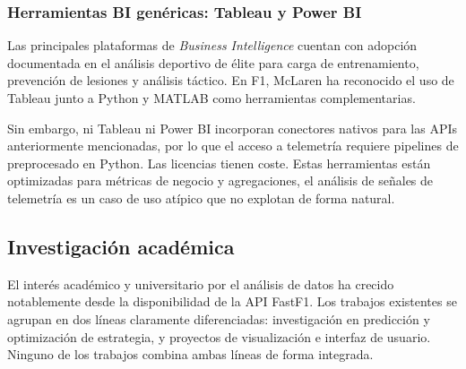 \documentclass[12pt,a4paper,twoside,openright]{book}
\begin{document}
\subsubsection{Herramientas BI genéricas: Tableau y Power BI}
\noindent Las principales plataformas de \textit{Business Intelligence} cuentan con adopción documentada en el análisis deportivo de élite para carga de entrenamiento, prevención de lesiones y análisis táctico. En F1, McLaren ha reconocido el uso de Tableau junto a Python y MATLAB como herramientas complementarias.

\noindent Sin embargo, ni Tableau ni Power BI incorporan conectores nativos para las APIs anteriormente mencionadas, por lo que el acceso a telemetría requiere pipelines de preprocesado en Python. Las licencias tienen coste.
Estas herramientas están optimizadas para métricas de negocio y agregaciones, el análisis de señales de telemetría es un caso de uso atípico que no explotan de forma natural.

\subsection{Investigación académica}
\noindent El interés académico y universitario por el análisis de datos ha crecido notablemente desde la disponibilidad de la API FastF1. Los trabajos existentes se agrupan en dos líneas claramente diferenciadas: investigación en predicción y optimización de estrategia, y proyectos de visualización e interfaz de usuario. Ninguno de los trabajos combina ambas líneas de forma integrada.
\end{document}
